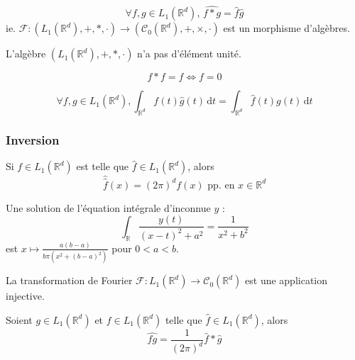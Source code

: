 	
	\begin{proposition}
		\[ \forall f, g \in L_1(\mathbb{R}^d), \, \widehat{f * g} = \widehat{f} \widehat{g} \]
		ie. $\mathcal{F} : (L_1(\mathbb{R}^d), +, *, \cdot) \rightarrow (\mathcal{C}_0(\mathbb{R}^d), +, \times, \cdot)$ est un morphisme d'algèbres.
	\end{proposition}
	
	\begin{corollary}
		L'algèbre $(L_1(\mathbb{R}^d), +, *, \cdot)$ n'a pas d'élément unité.
	\end{corollary}
	
	\begin{application}
		\[ f * f = f \iff f = 0 \]
	\end{application}
	
	\begin{theorem}
		\[ \forall f, g \in L_1(\mathbb{R}^d), \int_{\mathbb{R}^d} f(t) \widehat{g}(t) \, \mathrm{d}t = \int_{\mathbb{R}^d} \widehat{f}(t) g(t) \, \mathrm{d}t \]
	\end{theorem}
	
	\subsubsection{Inversion}
	
	\begin{theorem}
		Si $f \in L_1(\mathbb{R}^d)$ est telle que $\widehat{f} \in L_1(\mathbb{R}^d)$, alors
		\[ \widehat{\widehat{f}}(x) = (2\pi)^d f(x) \text{ pp. en } x \in \mathbb{R}^d \]
	\end{theorem}
	
	\begin{example}
		Une solution de l'équation intégrale d'inconnue $y$ :
		\[ \int_{\mathbb{R}} \frac{y(t)}{(x-t)^2 + a^2} = \frac{1}{x^2 + b^2} \]
		est $x \mapsto \frac{a(b-a)}{b \pi (x^2 + (b-a)^2)}$ pour $0 < a < b$.
	\end{example}
	
	\begin{corollary}
		La transformation de Fourier $\mathcal{F} : L_1(\mathbb{R}^d) \rightarrow \mathcal{C}_0(\mathbb{R}^d)$ est une application injective.
	\end{corollary}
	
	\begin{proposition}
		Soient $g \in L_1(\mathbb{R}^d)$ et $f \in L_1(\mathbb{R}^d)$ telle que $\widehat{f} \in L_1(\mathbb{R}^d)$, alors
		\[ \widehat{fg} = \frac{1}{(2\pi)^d} \widehat{f} * \widehat{g} \]
	\end{proposition}
	
